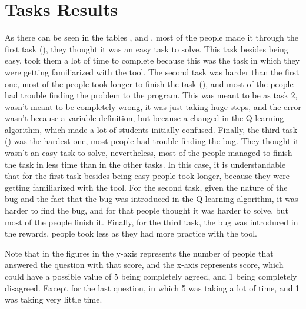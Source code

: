 \section{Tasks Results}
\label{sec:tasks-results}
As there can be seen in the tables ,  and 
, most of the people made it through the first task (),
they thought it was an easy task to solve. This task besides being easy, took them a lot of 
time to complete because this was the task in which they were getting familiarized with the 
tool. The second task was harder than the first one, most of the people took longer to finish the 
task (), and most of the people had trouble finding the problem to the program. 
This was meant to be as task 2, wasn't meant to be completely wrong, it was just taking huge 
steps, and the error wasn't because a variable definition, but because a changed in the Q-learning
algorithm, which made a lot of students initially confused. Finally, the third task () was the hardest 
one, most people had trouble finding the bug. They thought it wasn't an easy task to solve, 
nevertheless, most of the people managed to finish the task in less time than in the other tasks. 
In this case, it is understandable that for the first task besides being 
easy people took longer, because they were getting familiarized with the tool. For the second task,
given the nature of the bug and the fact that the bug was introduced in the Q-learning algorithm, 
it was harder to find the bug, and for that people thought it was harder to solve, but
most of the people finish it. Finally, for the third task, the bug was introduced in the rewards,
people took less as they had more practice with the tool.

Note that in the figures in  the y-axis represents the number of people 
that answered the question with that score, and the x-axis represents score, which could have a 
possible value of 5 being completely agreed, and 1 being completely disagreed. Except for the 
last question, in which 5 was taking a lot of time, and 1 was taking very little time.

